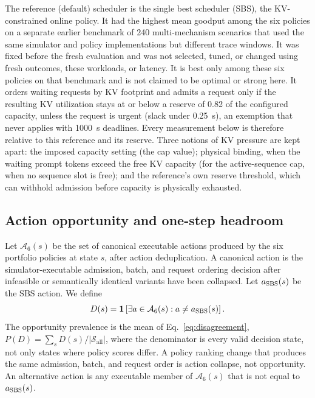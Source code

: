 \documentclass[preprint,12pt]{elsarticle}
\begin{document}
The reference (default) scheduler is the single best scheduler (SBS), the
KV-constrained online policy. It had the highest mean goodput among the six
policies on a separate earlier benchmark of 240 multi-mechanism scenarios that
used the same simulator and policy implementations but different trace windows. It was fixed before the fresh evaluation and was
not selected, tuned, or changed using fresh outcomes, these workloads, or
latency. It is best only among these six policies on that benchmark and is not
claimed to be optimal or strong here. It orders waiting requests by
KV footprint and admits a request only if the resulting KV utilization stays at
or below a reserve of 0.82 of the configured capacity, unless the request is
urgent (slack under 0.25~s), an exemption that never applies with 1000~s
deadlines. Every measurement below is therefore relative to this reference and
its reserve. Three notions of KV pressure are kept apart: the imposed capacity
setting (the cap value); physical binding, when the waiting prompt tokens exceed
the free KV capacity (for the active-sequence cap, when no sequence slot is
free); and the reference's own reserve threshold, which can withhold admission
before capacity is physically exhausted.

\subsection{Action opportunity and one-step headroom}
\label{sec:actions}
Let $\mathcal{A}_6(s)$ be the set of canonical executable actions produced by
the six portfolio policies at state $s$, after action deduplication. A
canonical action is the simulator-executable admission, batch, and request
ordering decision after infeasible or semantically identical variants have
been collapsed. Let $a_{\mathrm{SBS}}(s)$ be the SBS action. We define
\begin{equation}
  D(s) = \mathbf{1}\left[\exists a\in\mathcal{A}_6(s):
  a\ne a_{\mathrm{SBS}}(s)\right].
  \label{eq:disagreement}
\end{equation}
The opportunity prevalence is the mean of Eq.~\ref{eq:disagreement},
$P(D)=\sum_sD(s)/|\mathcal{S}_{\mathrm{all}}|$,
where the denominator is every valid decision state, not only states where
policy scores differ. A policy ranking change that produces the same admission,
batch, and request order is action collapse, not opportunity. An alternative
action is any executable member of $\mathcal{A}_6(s)$ that is not equal to
$a_{\mathrm{SBS}}(s)$.
\end{document}
